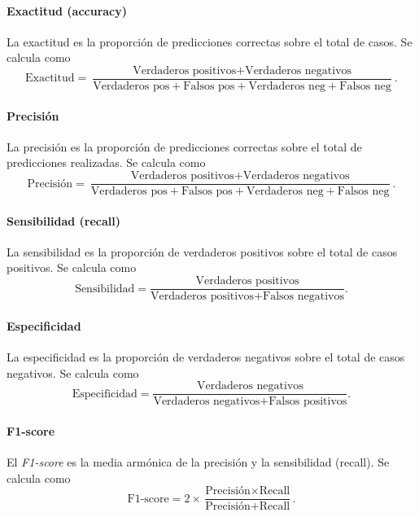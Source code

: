 \documentclass[a4paper]{report}
\begin{document}
\paragraph{Exactitud (accuracy)}
La exactitud es la proporción de predicciones correctas sobre el total de casos.
Se calcula como
\begin{equation}
	\text{Exactitud} = \frac{\text{Verdaderos positivos} + \text{Verdaderos negativos}}{\text{Verdaderos pos} + \text{Falsos pos} + \text{Verdaderos neg} + \text{Falsos neg}}.
\end{equation}

\paragraph{Precisión}
La precisión es la proporción de predicciones correctas sobre el total de predicciones realizadas.
Se calcula como
\begin{equation}
	\text{Precisión} = \frac{\text{Verdaderos positivos} + \text{Verdaderos negativos}}{\text{Verdaderos pos} + \text{Falsos pos} + \text{Verdaderos neg} + \text{Falsos neg}}.
\end{equation}

\paragraph{Sensibilidad (recall)}
La sensibilidad es la proporción de verdaderos positivos sobre el total de casos positivos.
Se calcula como
\begin{equation}
	\text{Sensibilidad} = \frac{\text{Verdaderos positivos}}{\text{Verdaderos positivos} + \text{Falsos negativos}}.
\end{equation}

\paragraph{Especificidad}
La especificidad es la proporción de verdaderos negativos sobre el total de casos negativos.
Se calcula como
\begin{equation}
	\text{Especificidad} = \frac{\text{Verdaderos negativos}}{\text{Verdaderos negativos} + \text{Falsos positivos}}.
\end{equation}

\paragraph{F1-score}
El \emph{F1-score} es la media armónica de la precisión y la sensibilidad (recall).
Se calcula como
\begin{equation}
	\text{F1-score} = 2 \times \frac{\text{Precisión} \times \text{Recall}}{\text{Precisión} + \text{Recall}}.
\end{equation}
\end{document}
